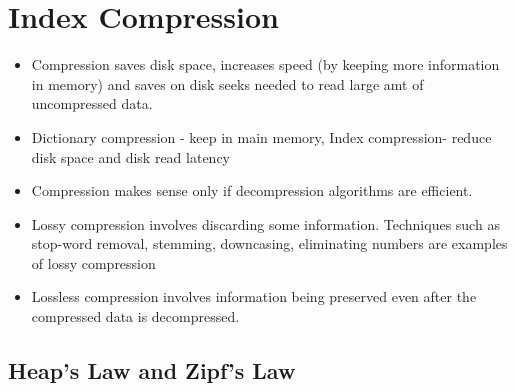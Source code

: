 \documentclass{article}
\begin{document}
\section{Index Compression}
\begin{itemize}
    \item Compression saves disk space, increases speed (by keeping more information in memory) and saves on disk seeks needed to read large amt of uncompressed data. 
    
    \item Dictionary compression - keep in main memory, Index compression- reduce disk space and disk read latency
    
    \item Compression makes sense only if decompression algorithms are efficient.
    
    \item Lossy compression involves discarding some information. Techniques such as stop-word removal, stemming, downcasing, eliminating numbers are examples of lossy compression
    
    \item Lossless compression involves information being preserved even after the compressed data is decompressed. 
\end{itemize}

\subsection{Heap's Law and Zipf's Law}
\end{document}
